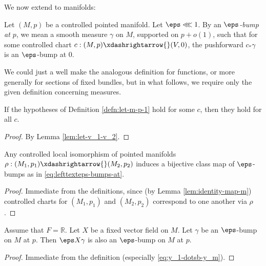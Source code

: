 We now extend to manifolds:

\begin{definition}\label{defn:let-m-p-1}
  Let $(M,p)$ be a controlled pointed manifold.  Let $\eps \lll 1$.  By an \emph{$\eps$-bump at $p$}, we mean a smooth measure $\gamma$ on $M$, supported on $p + o(1)$, such that for some controlled chart $c : (M,p) \xdashrightarrow{} (V,0)$, the pushforward $c_* \gamma$ is an $\eps$-bump at $0$.
\end{definition}
\begin{remark}
  We could just a well make the analogous definition for functions, or more generally for sections of fixed bundles, but in what follows, we require only the given definition concerning measures.
\end{remark}
\begin{lemma}
  If the hypotheses of Definition \ref{defn:let-m-p-1} hold for some $c$, then they hold for all $c$.
\end{lemma}
\begin{proof}
  By Lemma \ref{lem:let-v_1-v_2}.
\end{proof}
\begin{lemma}\label{lem:standard2:any-controlled-local}
  Any controlled local isomorphism of pointed manifolds $\rho : (M_1, p_1) \xdashrightarrow{} (M_2, p_2)$ induces a bijective class map of $\eps$-bumps as in \eqref{eq:lefttexteps-bumps-at}.
\end{lemma}
\begin{proof}
  Immediate from the definitions, since (by Lemma \ref{lem:identity-map-m})  controlled charts for $(M_1,p_1)$ and $(M_2,p_2)$ correspond to one another via $\rho$.
\end{proof}


\begin{lemma}\label{lem:standard2:bump-preserved-under-vector-field}
  Assume that $F = \mathbb{R}$.  Let $X$ be a fixed vector field on $M$.  Let $\gamma$ be an $\eps$-bump on $M$ at $p$.  Then $\eps X \gamma$ is also an $\eps$-bump on $M$ at $p$.
\end{lemma}
\begin{proof}
  Immediate from the definition (especially \eqref{eq:y_1-dotsb-y_m}).
\end{proof}

